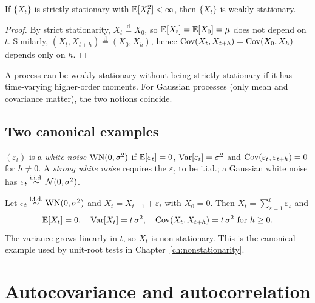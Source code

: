 \begin{propbox}
\label{prop:strict-weak}
If $\{X_t\}$ is strictly stationary with $\mathbb{E}[X_t^2] < \infty$, then
$\{X_t\}$ is weakly stationary.
\end{propbox}

\begin{proof}
By strict stationarity, $X_t \overset{\text{d}}{=} X_0$, so
$\mathbb{E}[X_t] = \mathbb{E}[X_0] = \mu$ does not depend on $t$. Similarly,
$(X_t, X_{t+h}) \overset{\text{d}}{=} (X_0, X_h)$, hence
$\mathrm{Cov}(X_t, X_{t+h}) = \mathrm{Cov}(X_0, X_h)$ depends only on $h$.
\end{proof}

\begin{rembox}
A process can be weakly stationary without being strictly stationary
if it has time-varying higher-order moments. For Gaussian processes
(only mean and covariance matter), the two notions coincide.
\end{rembox}

\subsection{Two canonical examples}

\begin{defbox}
\label{def:wn}
$(\varepsilon_t)$ is a \emph{white noise} $\mathrm{WN}(0, \sigma^2)$ if
$\mathbb{E}[\varepsilon_t] = 0$, $\mathrm{Var}[\varepsilon_t] = \sigma^2$ and
$\mathrm{Cov}(\varepsilon_t, \varepsilon_{t+h}) = 0$ for $h \neq 0$.
A \emph{strong white noise} requires the $\varepsilon_t$ to be
i.i.d.; a Gaussian white noise has $\varepsilon_t \overset{\text{i.i.d.}}{\sim} \mathcal{N}(0, \sigma^2)$.
\end{defbox}

\begin{exbox}
\label{ex:random-walk}
Let $\varepsilon_t \overset{\text{i.i.d.}}{\sim} \mathrm{WN}(0, \sigma^2)$ and
$X_t = X_{t-1} + \varepsilon_t$ with $X_0 = 0$. Then
$X_t = \sum_{s = 1}^{t} \varepsilon_s$ and
\[
  \mathbb{E}[X_t] = 0,
  \quad
  \mathrm{Var}[X_t] = t\, \sigma^2,
  \quad
  \mathrm{Cov}(X_t, X_{t+h}) = t\, \sigma^2 \text{ for } h \geq 0.
\]
The variance grows linearly in $t$, so $X_t$ is non-stationary. This
is the canonical example used by unit-root tests in
Chapter~\ref{ch:nonstationarity}.
\end{exbox}

\section{Autocovariance and autocorrelation}
\label{sec:acf}


